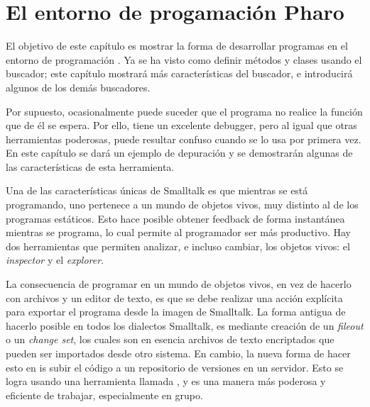 \documentclass[spanish,a4paper,10pt,twoside]{book}
\begin{document}
	\sloppy
\fi
\chapter{El entorno de progamaci\'on Pharo}


El objetivo de este cap\'itulo es mostrar la forma de desarrollar programas en el entorno de programaci\'on \pharo.
Ya se ha visto como definir m\'etodos y clases usando el buscador; este cap\'itulo mostrar\'a m\'as caracter\'isticas del buscador, e introducir\'a algunos de los dem\'as buscadores.

Por supuesto, ocasionalmente puede suceder que el programa no realice la
funci\'on que de \'el se espera. Por ello, \pharo tiene un excelente debugger,
pero al igual que otras herramientas poderosas, puede resultar confuso cuando se lo usa por primera vez. En este cap\'itulo se dar\'a un ejemplo de depuraci\'on y se demostrar\'an algunas de las caracter\'isticas de esta herramienta.

Una de las caracter\'isticas \'unicas de Smalltalk es que mientras se est\'a programando, uno pertenece a un mundo de objetos vivos, muy distinto al de los programas est\'aticos. Esto hace posible obtener feedback de forma instant\'anea mientras se programa, lo cual permite al programador ser m\'as productivo. Hay dos herramientas que permiten analizar, e incluso cambiar, los objetos vivos: el \emph{inspector} y el \emph{explorer}.

La consecuencia de programar en un mundo de objetos vivos, en vez de hacerlo con archivos y un editor de texto, es que se debe realizar una acci\'on expl\'icita para exportar el programa desde la imagen de Smalltalk.
La forma antigua de hacerlo posible en todos los dialectos Smalltalk, es mediante creaci\'on de un \emph{fileout} o un \emph{change set}, los cuales son en esencia archivos de texto encriptados que pueden ser importados desde otro sistema.
En cambio, la nueva forma de hacer esto en \pharo is subir el c\'odigo a un repositorio de versiones en un servidor.  Esto se logra usando una herramienta llamada , y es una manera m\'as poderosa y eficiente de trabajar, especialmente en grupo.

\end{document}
